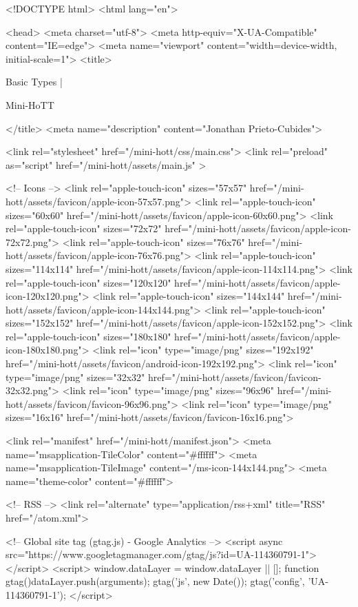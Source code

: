 <!DOCTYPE html>
<html lang="en">

<head>
  <meta charset="utf-8">
  <meta http-equiv="X-UA-Compatible" content="IE=edge">
  <meta name="viewport" content="width=device-width, initial-scale=1">
  <title>
    
      
        Basic Types |
      
        Mini-HoTT
    
  </title>
  <meta name="description" content="Jonathan Prieto-Cubides">

  <link rel="stylesheet" href="/mini-hott/css/main.css">
  <link rel="preload" as="script" href="/mini-hott/assets/main.js" >

  <!-- Icons -->
  <link rel="apple-touch-icon" sizes="57x57" href="/mini-hott/assets/favicon/apple-icon-57x57.png">
  <link rel="apple-touch-icon" sizes="60x60" href="/mini-hott/assets/favicon/apple-icon-60x60.png">
  <link rel="apple-touch-icon" sizes="72x72" href="/mini-hott/assets/favicon/apple-icon-72x72.png">
  <link rel="apple-touch-icon" sizes="76x76" href="/mini-hott/assets/favicon/apple-icon-76x76.png">
  <link rel="apple-touch-icon" sizes="114x114" href="/mini-hott/assets/favicon/apple-icon-114x114.png">
  <link rel="apple-touch-icon" sizes="120x120" href="/mini-hott/assets/favicon/apple-icon-120x120.png">
  <link rel="apple-touch-icon" sizes="144x144" href="/mini-hott/assets/favicon/apple-icon-144x144.png">
  <link rel="apple-touch-icon" sizes="152x152" href="/mini-hott/assets/favicon/apple-icon-152x152.png">
  <link rel="apple-touch-icon" sizes="180x180" href="/mini-hott/assets/favicon/apple-icon-180x180.png">
  <link rel="icon" type="image/png" sizes="192x192"  href="/mini-hott/assets/favicon/android-icon-192x192.png">
  <link rel="icon" type="image/png" sizes="32x32" href="/mini-hott/assets/favicon/favicon-32x32.png">
  <link rel="icon" type="image/png" sizes="96x96" href="/mini-hott/assets/favicon/favicon-96x96.png">
  <link rel="icon" type="image/png" sizes="16x16" href="/mini-hott/assets/favicon/favicon-16x16.png">

  <link rel="manifest" href="/mini-hott/manifest.json">
  <meta name="msapplication-TileColor" content="#ffffff">
  <meta name="msapplication-TileImage" content="/ms-icon-144x144.png">
  <meta name="theme-color" content="#ffffff">

  <!-- RSS -->
  <link rel="alternate" type="application/rss+xml" title="RSS" href="/atom.xml">

  <!-- Global site tag (gtag.js) - Google Analytics -->
  <script async src="https://www.googletagmanager.com/gtag/js?id=UA-114360791-1"></script>
  <script>
    window.dataLayer = window.dataLayer || [];
    function gtag(){dataLayer.push(arguments);}
    gtag('js', new Date());
    gtag('config', 'UA-114360791-1');
  </script>

